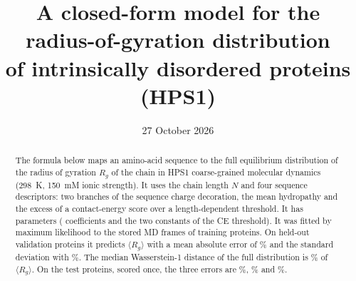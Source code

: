 \documentclass[11pt]{article}
\title{A closed-form model for the radius-of-gyration distribution\\ of intrinsically disordered proteins (HPS1)}
\date{27 October 2026}
\author{}
\newcommand{\Rg}{R_g}
\begin{document}
\maketitle

\begin{abstract}
\noindent
The formula below maps an amino-acid sequence to the full equilibrium distribution of the radius of gyration $\Rg$ of
the chain in HPS1 coarse-grained molecular dynamics (298~K, 150~mM ionic strength). It uses the chain length $N$ and
four sequence descriptors: two branches of the sequence charge decoration, the mean hydropathy and the excess of a
contact-energy score over a length-dependent threshold. It has  parameters ( coefficients and the two constants of the CE
threshold). It was fitted by maximum likelihood to the stored MD frames of  training proteins. On
 held-out validation proteins it predicts $\langle\Rg\rangle$ with a mean absolute error of
\% and the standard deviation with \%. The median Wasserstein-1
distance of the full distribution is \% of $\langle\Rg\rangle$. On the  test
proteins, scored once, the three errors are \%, \% and
\%.
\end{abstract}

\end{document}
